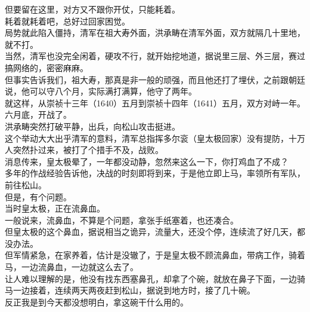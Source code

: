 \begin{multicols}{\theparacolNo}
但要留在这里，对方又不跟你开仗，只能耗着。\\

耗着就耗着吧，总好过回家困觉。\\

局势就此陷入僵持，清军在祖大寿外面，洪承畴在清军外面，双方就隔几十里地，就不打。\\

当然，清军也没完全闲着，硬攻不行，就开始挖地道，据说里三层、外三层，赛过搞网络的，密密麻麻。\\

但事实告诉我们，祖大寿，那真是非一般的顽强，而且他还打了埋伏，之前跟朝廷说，他可以守八个月，实际满打满算，他守了两年。\\

就这样，从崇祯十三年（1640）五月到崇祯十四年（1641）五月，双方对峙一年。\\

六月底，开战了。\\

洪承畴突然打破平静，出兵，向松山攻击挺进。\\

这个举动大大出乎清军的意料，清军总指挥多尔衮（皇太极回家）没有提防，十万人突然扑过来，被打了个措手不及，战败。\\

消息传来，皇太极晕了，一年都没动静，忽然来这么一下，你打鸡血了不成？\\

多年的作战经验告诉他，决战的时刻即将到来，于是他立即上马，率领所有军队，前往松山。\\

但是，有个问题。\\

当时皇太极，正在流鼻血。\\

一般说来，流鼻血，不算是个问题，拿张手纸塞着，也还凑合。\\

但皇太极的这个鼻血，据说相当之诡异，流量大，还没个停，连续流了好几天，都没办法。\\

但军情紧急，在家养着，估计是没辙了，于是皇太极不顾流鼻血，带病工作，骑着马，一边流鼻血，一边就这么去了。\\

让人难以理解的是，他没有找东西塞鼻孔，却拿了个碗，就放在鼻子下面，一边骑马一边接着，连续两天两夜赶到松山，据说到地方时，接了几十碗。\\

反正我是到今天都没想明白，拿这碗干什么用的。\\


\end{multicols}
